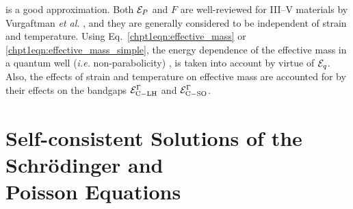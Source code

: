 \documentclass[12pt]{report}
\begin{document}
is a good approximation.  Both $\EE_P$ and $F$ are well-reviewed for III--V materials by Vurgaftman \emph{et al.} \cite{Vurgaftman}, and they are generally considered to be independent of strain and temperature.  Using Eq.~\eqref{chpt1eqn:effective_mass} or \eqref{chpt1eqn:effective_mass_simple}, the energy dependence of the effective mass in a quantum well (\emph{i.e.} non-parabolicity) \cite{Sirtori:PRB:1994}, \cite{Nelson:PRB:1987} is taken into account by virtue of $\EE_q$.  Also, the effects of strain and temperature on effective mass are accounted for by their effects on the bandgaps $\EE_{\tn{C}-\tn{LH}}^\Gamma$ and $\EE_{\tn{C}-\tn{SO}}^\Gamma$.



\section[Self-consistent Solutions of the Schr\"{o}dinger and Poisson Equations]{Self-consistent Solutions of the Schr\"{o}dinger and \\ Poisson Equations}
\end{document}
